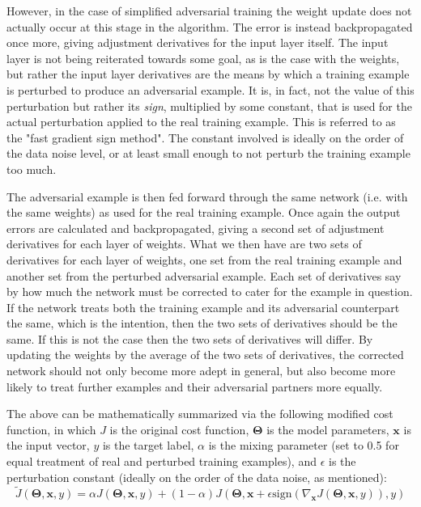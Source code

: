 \documentclass{article} %
\begin{document}
However, in the case of simplified adversarial training the weight update does not actually occur at this stage in the algorithm. The error is instead backpropagated once more, giving adjustment derivatives for the input layer itself. The input layer is not being reiterated towards some goal, as is the case with the weights, but rather the input layer derivatives are the means by which a training example is perturbed to produce an adversarial example. It is, in fact, not the value of this perturbation but rather its \textit{sign}, multiplied by some constant, that is used for the actual perturbation applied to the real training example. This is referred to as the "fast gradient sign method". The constant involved is ideally on the order of the data noise level, or at least small enough to not perturb the training example too much.

The adversarial example is then fed forward through the same network (i.e. with the same weights) as used for the real training example. Once again the output errors are calculated and backpropagated, giving a second set of adjustment derivatives for each layer of weights. What we then have are two sets of derivatives for each layer of weights, one set from the real training example and another set from the perturbed adversarial example. Each set of derivatives say by how much the network must be corrected to cater for the example in question. If the network treats both the training example and its adversarial counterpart the same, which is the intention, then the two sets of derivatives should be the same. If this is not the case then the two sets of derivatives will differ. By updating the weights by the average of the two sets of derivatives, the corrected network should not only become more adept in general, but also become more likely to treat further examples and their adversarial partners more equally.

The above can be mathematically summarized via the following modified cost function, in which $J$ is the original cost function, $\mathbf{\Theta}$ is the model parameters, $\mathbf{x}$ is the input vector, $y$ is the target label, $\alpha$ is the mixing parameter (set to 0.5 for equal treatment of real and perturbed training examples), and $\epsilon$ is the perturbation constant (ideally on the order of the data noise, as mentioned):
\begin{equation*}
\tilde{J}(\mathbf{\Theta},\mathbf{x},y) = \alpha J(\mathbf{\Theta},\mathbf{x},y) + (1-\alpha)J(\mathbf{\Theta},\mathbf{x} + \epsilon\text{sign}(\nabla_\mathbf{x}J(\mathbf{\Theta},\mathbf{x},y)),y)
\end{equation*}
\end{document}
